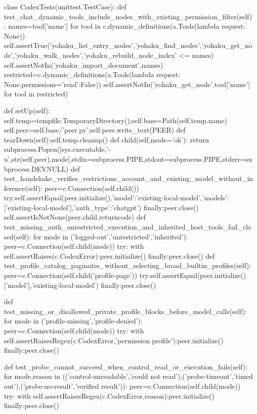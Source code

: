 class CodexTests(unittest.TestCase):
    def test_chat_dynamic_tools_include_nodes_with_existing_permission_filter(self):
        names={tool['name'] for tool in c.dynamic_definitions(a.Tools(lambda request: None))}
        self.assertTrue({'yohaku_list_entry_nodes','yohaku_find_nodes','yohaku_get_node','yohaku_walk_nodes','yohaku_rebuild_node_index'} <= names)
        self.assertNotIn('yohaku_import_document',names)
        restricted=c.dynamic_definitions(a.Tools(lambda request: None,permissions={'read':False}))
        self.assertNotIn('yohaku_get_node',{tool['name'] for tool in restricted})

    def setUp(self):
        self.temp=tempfile.TemporaryDirectory();self.base=Path(self.temp.name)
        self.peer=self.base/'peer.py';self.peer.write_text(PEER)
    def tearDown(self):self.temp.cleanup()
    def child(self,mode='ok'):
        return subprocess.Popen([sys.executable,'-u',str(self.peer),mode],stdin=subprocess.PIPE,stdout=subprocess.PIPE,stderr=subprocess.DEVNULL)
    def test_handshake_verifies_restrictions_account_and_existing_model_without_inference(self):
        peer=c.Connection(self.child())
        try:self.assertEqual(peer.initialize(),{'model':'existing-local-model','models':['existing-local-model'],'auth_type':'chatgpt'})
        finally:peer.close()
        self.assertIsNotNone(peer.child.returncode)
    def test_missing_auth_unrestricted_execution_and_inherited_host_tools_fail_closed(self):
        for mode in ('logged-out','unrestricted','inherited'):
            peer=c.Connection(self.child(mode))
            try:
                with self.assertRaises(c.CodexError):peer.initialize()
            finally:peer.close()
    def test_profile_catalog_paginates_without_selecting_broad_builtin_profiles(self):
        peer=c.Connection(self.child('profile-page'))
        try:self.assertEqual(peer.initialize()['model'],'existing-local-model')
        finally:peer.close()

    def test_missing_or_disallowed_private_profile_blocks_before_model_calls(self):
        for mode in ('profile-missing','profile-denied'):
            peer=c.Connection(self.child(mode))
            try:
                with self.assertRaisesRegex(c.CodexError,'permission profile'):peer.initialize()
            finally:peer.close()

    def test_probe_cannot_succeed_when_control_read_or_execution_fails(self):
        for mode,reason in (('control-unreadable','could not read'),('probe-timeout','timed out'),('probe-no-result','verified result')):
            peer=c.Connection(self.child(mode))
            try:
                with self.assertRaisesRegex(c.CodexError,reason):peer.initialize()
            finally:peer.close()

